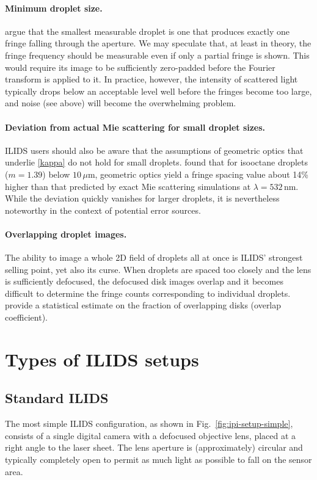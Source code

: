 \documentclass[11.5pt,oneside]{book}
\newcommand*{\figref}[1]{Fig.~\ref{#1}}
\begin{document}
\paragraph{Minimum droplet size.}
\citet{Damaschke02} argue that the smallest measurable droplet is one that
produces exactly one fringe falling through the aperture. We may speculate that, at least
in theory, the fringe frequency should be measurable even if only a partial
fringe is shown. This would require its image to be sufficiently zero-padded
before the Fourier transform is applied to it. In practice, however, the
intensity of scattered light typically drops below an acceptable level well before
the fringes become too large, and noise (see above) will become the overwhelming
problem.

\paragraph{Deviation from actual Mie scattering for small droplet sizes.}
ILIDS users should also be aware that the assumptions of geometric optics
that underlie \eqref{kappa} do not hold for small droplets. \citet{Mounaim99}
found that for isooctane droplets ($m=1.39$) below $10\,\mu$m, geometric optics
yield a fringe spacing value about 14\% higher than that predicted by exact Mie
scattering simulations at $\lambda=532\,$nm. While the deviation quickly
vanishes for larger droplets, it is nevertheless noteworthy in the context of
potential error sources.

\paragraph{Overlapping droplet images.}
The ability to image a whole 2D field of droplets all at once is ILIDS' strongest
selling point, yet also its curse. When droplets are spaced too closely and the
lens is sufficiently defocused, the defocused disk images overlap and it becomes
difficult to determine the fringe counts corresponding to individual droplets.
\citet{Damaschke02} provide a statistical estimate on the fraction of
overlapping disks (overlap coefficient). 


\section{Types of ILIDS setups}
\label{sec:ipi-setup}
\subsection{Standard ILIDS}
The most simple ILIDS configuration, as shown in \figref{fig:ipi-setup-simple},
consists of a single digital camera with a defocused objective lens, placed at a right
angle to the laser sheet. The lens aperture is (approximately) circular and
typically completely open to permit as much light as possible to fall on the
sensor area.
\end{document}
